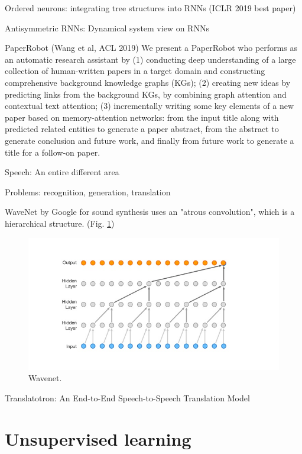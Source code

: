 \documentclass[english]{article}
\begin{document}
\item Ordered neurons: integrating tree structures into RNNs (ICLR 2019 best paper)

\item Antisymmetric RNNs: Dynamical system view on RNNs

\item PaperRobot (Wang et al, ACL 2019) We present a PaperRobot who performs as an automatic research assistant by (1) conducting deep understanding of a large collection of human-written papers in a target domain and constructing comprehensive background knowledge graphs (KGs); (2) creating new ideas by predicting links from the background KGs, by combining graph attention and contextual text attention; (3) incrementally writing some key elements of a new paper based on memory-attention networks: from the input title along with predicted related entities to generate a paper abstract, from the abstract to generate conclusion and future work, and finally from future work to generate a title for a follow-on paper. 

\item Speech: An entire different area

Problems: recognition, generation, translation


WaveNet by Google for sound synthesis uses an "atrous convolution", which is a hierarchical structure. (Fig. \ref{wavenet})

\begin{figure}
  \centering
  \includegraphics[scale=0.8]{wavenet.jpg}
    \caption{Wavenet.}
    \label{wavenet}
\end{figure}

Translatotron: An End-to-End Speech-to-Speech Translation Model


\eenum 

\section{Unsupervised learning}
\end{document}
